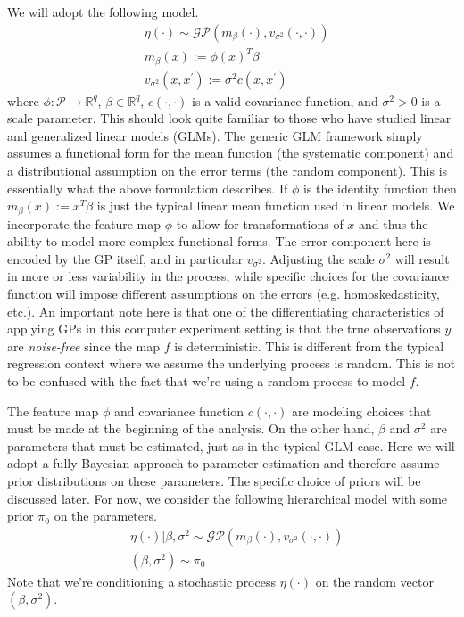\documentclass[12pt]{article}
\newcommand{\R}{\mathcal{R}}
\def\R{\mathbb{R}}
\begin{document}
We will adopt the following model. 
\begin{align*}
&\eta(\cdot) \sim \mathcal{GP}(m_\beta (\cdot), v_{\sigma^2}(\cdot, \cdot)) \\
&m_\beta (x) := \phi(x)^T \beta \\
&v_{\sigma^2}(x, x^\prime) := \sigma^2 c(x, x^\prime)
\end{align*}
where $\phi: \mathcal{P} \to \R^q$, $\beta \in \R^q$, $c(\cdot, \cdot)$ is a valid covariance function, and $\sigma^2 > 0$ is a scale parameter. 
This should look quite familiar to those who have studied linear and generalized linear models (GLMs). The generic GLM framework simply assumes a functional form for the mean function
(the systematic component) and a distributional assumption on the error terms (the random component). This is essentially what the above formulation describes. If $\phi$ is the identity function
then $m_\beta (x) := x^T \beta$ is just the typical linear mean function used in linear models. We incorporate the feature map $\phi$ to allow for transformations of $x$ and thus the ability to 
model more complex functional forms. The error component here is encoded by the GP itself, and in particular $v_{\sigma^2}$. Adjusting the scale $\sigma^2$ will result in more or less 
variability in the process, while specific choices for the covariance function will impose different assumptions on the errors (e.g. homoskedasticity, etc.). An important note here is that one of the 
differentiating characteristics of applying GPs in this computer experiment setting is that the true observations $y$ are \textit{noise-free} since the map $f$ is deterministic. This is different from the 
typical regression context where we assume the underlying process is random. This is not to be confused with the fact that we're using a random process to model $f$. 

The feature map $\phi$ and covariance function $c(\cdot, \cdot)$ are modeling choices that must be made at the beginning of the analysis. On the other hand, $\beta$ and $\sigma^2$ are parameters
that must be estimated, just as in the typical GLM case. Here we will adopt a fully Bayesian approach to parameter estimation and therefore assume prior distributions on these parameters. The specific 
choice of priors will be discussed later. For now, we consider the following hierarchical model with some prior $\pi_0$ on the parameters. 
\begin{align*}
&\eta(\cdot)|\beta, \sigma^2 \sim \mathcal{GP}(m_\beta (\cdot), v_{\sigma^2}(\cdot, \cdot)) \\
&(\beta, \sigma^2) \sim \pi_0
\end{align*}
Note that we're conditioning a stochastic process $\eta(\cdot)$ on the random vector $(\beta, \sigma^2)$. 
\end{document}
